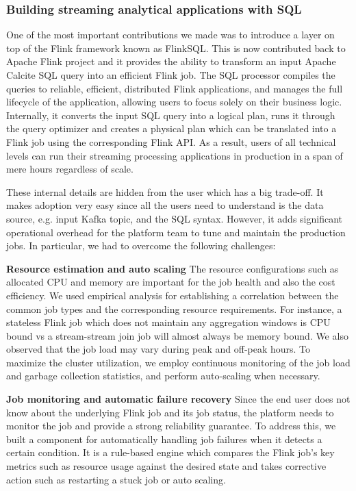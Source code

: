\documentclass[sigconf]{acmart}
\begin{document}
\subsubsection{Building streaming analytical applications with SQL}

One of the most important contributions we made was to introduce a layer on top of the Flink framework known as FlinkSQL\cite{athenax}. This is now contributed back to Apache Flink project and it provides the ability to transform an input Apache Calcite\cite{calcite} SQL query into an efficient Flink job. The SQL processor compiles the queries to reliable, efficient, distributed Flink applications, and manages the full lifecycle of the application, allowing users to focus solely on their business logic. Internally, it converts the input SQL query into a logical plan, runs it through the query optimizer and creates a physical plan which can be translated into a Flink job using the corresponding Flink API. As a result, users of all technical levels can run their streaming processing applications in production in a span of mere hours regardless of scale.

These internal details are hidden from the user which has a big trade-off. It makes adoption very easy since all the users need to understand is the data source, e.g. input Kafka topic, and the SQL syntax. However, it adds significant operational overhead for the platform team to tune and maintain the production jobs. In particular, we had to overcome the following challenges:

{\bfseries Resource estimation and auto scaling} The resource configurations such as allocated CPU and memory are important for the job health and also the cost efficiency. We used empirical analysis for establishing a correlation between the common job types and the corresponding resource requirements. For instance, a stateless Flink job which does not maintain any aggregation windows is CPU bound vs a stream-stream join job will almost always be memory bound. We also observed that the job load may vary during peak and off-peak hours. To maximize the cluster utilization, we employ continuous monitoring of the job load and garbage collection statistics, and perform auto-scaling when necessary.

{\bfseries Job monitoring and automatic failure recovery} Since the end user does not know about the underlying Flink job and its job status, the platform needs to monitor the job and provide a strong reliability guarantee. To address this, we built a component for automatically handling job failures when it detects a certain condition. It is a rule-based engine which compares the Flink job’s key metrics such as resource usage against the desired state and takes corrective action such as restarting a stuck job or auto scaling.
\end{document}
